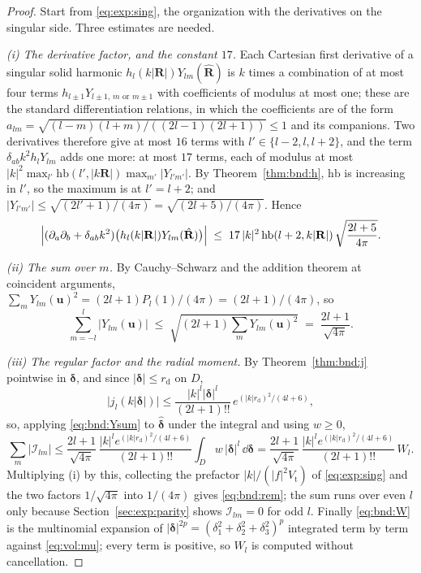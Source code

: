 \begin{proof}
Start from \eqref{eq:exp:sing}, the organization with the derivatives on the singular
side. Three estimates are needed.

\emph{(i) The derivative factor, and the constant $17$.} Each Cartesian first derivative
of a singular solid harmonic $h_l(k|\mathbf{R}|)Y_{lm}(\hat{\mathbf{R}})$ is $k$ times a
combination of at most four terms $h_{l\pm1}Y_{l\pm1,\,m\text{ or }m\pm1}$ with
coefficients of modulus at most one; these are the standard differentiation relations, in
which the coefficients are of the form
$a_{lm} = \sqrt{(l-m)(l+m)/((2l-1)(2l+1))} \le 1$ and its companions. Two derivatives
therefore give at most $16$ terms with $l' \in \{l-2,l,l+2\}$, and the term
$\delta_{ab}k^2 h_l Y_{lm}$ adds one more: at most $17$ terms, each of modulus at most
$|k|^2 \max_{l'}\mathrm{hb}(l',|k\mathbf{R}|)\max_{m'}|Y_{l'm'}|$. By
Theorem~\ref{thm:bnd:h}, $\mathrm{hb}$ is increasing in $l'$, so the maximum is at
$l' = l+2$; and $|Y_{l'm'}| \le \sqrt{(2l'+1)/(4\pi)} = \sqrt{(2l+5)/(4\pi)}$. Hence
\begin{equation}
\Bigl|(\partial_a\partial_b+\delta_{ab}k^2)
\bigl(h_l(k|\mathbf{R}|)Y_{lm}(\hat{\mathbf{R}})\bigr)\Bigr|
\;\le\; 17\,|k|^{2}\,\mathrm{hb}(l+2,k|\mathbf{R}|)\,\sqrt{\frac{2l+5}{4\pi}} .
\label{eq:bnd:17}
\end{equation}

\emph{(ii) The sum over $m$.} By Cauchy--Schwarz and the addition theorem at coincident
arguments, $\sum_{m}Y_{lm}(\mathbf{u})^2 = (2l+1)P_l(1)/(4\pi) = (2l+1)/(4\pi)$, so
\begin{equation}
\sum_{m=-l}^{l}\bigl|Y_{lm}(\mathbf{u})\bigr|
\;\le\; \sqrt{(2l+1)\sum_m Y_{lm}(\mathbf{u})^2}
\;=\; \frac{2l+1}{\sqrt{4\pi}} .
\label{eq:bnd:Ysum}
\end{equation}

\emph{(iii) The regular factor and the radial moment.} By Theorem~\ref{thm:bnd:j}
pointwise in $\boldsymbol{\delta}$, and since
$|\boldsymbol{\delta}| \le r_{\mathrm{d}}$ on $D$,
\[
\bigl|j_l(k|\boldsymbol{\delta}|)\bigr| \le
\frac{|k|^{l}|\boldsymbol{\delta}|^{l}}{(2l+1)!!}\,
e^{(|k|r_{\mathrm{d}})^{2}/(4l+6)} ,
\]
so, applying \eqref{eq:bnd:Ysum} to $\hat{\boldsymbol{\delta}}$ under the integral and
using $w \ge 0$,
\[
\sum_m \bigl|\mathcal{I}_{lm}\bigr|
\le \frac{2l+1}{\sqrt{4\pi}}\,
\frac{|k|^{l}e^{(|k|r_{\mathrm{d}})^{2}/(4l+6)}}{(2l+1)!!}
\int_D w\,|\boldsymbol{\delta}|^{l}\,\dd\boldsymbol{\delta}
= \frac{2l+1}{\sqrt{4\pi}}\,
\frac{|k|^{l}e^{(|k|r_{\mathrm{d}})^{2}/(4l+6)}}{(2l+1)!!}\,W_l .
\]
Multiplying (i) by this, collecting the prefactor $|k|/(|f|^2V_{\mathrm{t}})$ of
\eqref{eq:exp:sing} and the two factors $1/\sqrt{4\pi}$ into $1/(4\pi)$ gives
\eqref{eq:bnd:rem}; the sum runs over even $l$ only because
Section~\ref{sec:exp:parity} shows $\mathcal{I}_{lm} = 0$ for odd $l$. Finally
\eqref{eq:bnd:W} is the multinomial expansion of $|\boldsymbol{\delta}|^{2p} =
(\delta_1^2+\delta_2^2+\delta_3^2)^p$ integrated term by term against
\eqref{eq:vol:mu}; every term is positive, so $W_l$ is computed without cancellation.
\end{proof}

